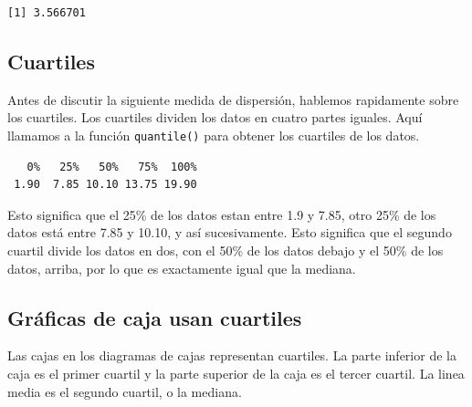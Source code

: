 \documentclass[
  letterpaper,
  DIV=11,
  numbers=noendperiod]{scrreprt}
\newenvironment{Shaded}{\begin{snugshade}}{\end{snugshade}}
\newcommand{\FunctionTok}[1]{\textcolor[rgb]{0.28,0.35,0.67}{#1}}
\newcommand{\NormalTok}[1]{\textcolor[rgb]{0.00,0.23,0.31}{#1}}
\newcommand{\OtherTok}[1]{\textcolor[rgb]{0.00,0.23,0.31}{#1}}
\newcommand{\SpecialCharTok}[1]{\textcolor[rgb]{0.37,0.37,0.37}{#1}}
\begin{document}
\begin{Shaded}
\end{Shaded}

\begin{verbatim}
[1] 3.566701
\end{verbatim}

\hypertarget{cuartiles}{%
\subsection{Cuartiles}\label{cuartiles}}

Antes de discutir la siguiente medida de dispersión, hablemos
rapidamente sobre los cuartiles. Los cuartiles dividen los datos en
cuatro partes iguales. Aquí llamamos a la función \texttt{quantile()}
para obtener los cuartiles de los datos.

\begin{Shaded}
\end{Shaded}

\begin{verbatim}
   0%   25%   50%   75%  100% 
 1.90  7.85 10.10 13.75 19.90 
\end{verbatim}

Esto significa que el 25\% de los datos estan entre 1.9 y 7.85, otro
25\% de los datos está entre 7.85 y 10.10, y así sucesivamente. Esto
significa que el segundo cuartil divide los datos en dos, con el 50\% de
los datos debajo y el 50\% de los datos, arriba, por lo que es
exactamente igual que la mediana.

\hypertarget{gruxe1ficas-de-caja-usan-cuartiles}{%
\subsection{Gráficas de caja usan
cuartiles}\label{gruxe1ficas-de-caja-usan-cuartiles}}

Las cajas en los diagramas de cajas representan cuartiles. La parte
inferior de la caja es el primer cuartil y la parte superior de la caja
es el tercer cuartil. La linea media es el segundo cuartil, o la
mediana.
\end{document}
